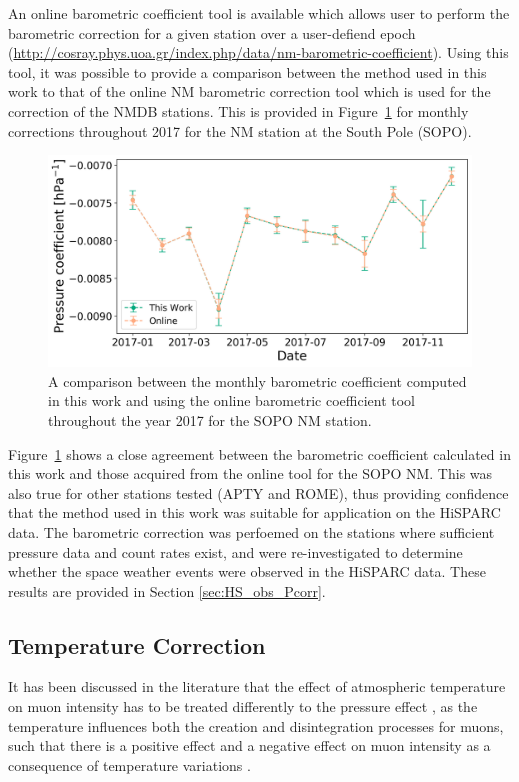 An online barometric coefficient tool is available which allows user to perform the barometric correction for a given station over a user-defiend epoch (\url{http://cosray.phys.uoa.gr/index.php/data/nm-barometric-coefficient}). Using this tool, it was possible to provide a comparison between the method used in this work to that of the online NM barometric correction tool which is used for the correction of the NMDB stations. This is provided in Figure~\ref{fig:NM_beta_variation} for monthly corrections throughout 2017 for the NM station at the South Pole (SOPO).

\begin{figure}[ht]
	\centering
	\includegraphics[width=0.65\columnwidth]{SOPO_beta_2017.png}
	\caption{A comparison between the monthly barometric coefficient computed in this work and using the online barometric coefficient tool throughout the year 2017 for the SOPO NM station.}
	\label{fig:NM_beta_variation}
\end{figure}


Figure~\ref{fig:NM_beta_variation} shows a close agreement between the barometric coefficient calculated in this work and those acquired from the online tool for the SOPO NM. This was also true for other stations tested (APTY and ROME), thus providing confidence that the method used in this work was suitable for application on the HiSPARC data. The barometric correction was perfoemed on the stations where sufficient pressure data and count rates exist, and were re-investigated to determine whether the space weather events were observed in the HiSPARC data. These results are provided in Section \ref{sec:HS_obs_Pcorr}.



\subsection{Temperature Correction}\label{sec:HS_T_corr}

It has been discussed in the literature that the effect of atmospheric temperature on muon intensity has to be treated differently to the pressure effect \citep{berkova_temperature_2011}, as the temperature influences both the creation and disintegration processes for muons, such that there is a positive effect and a negative effect on muon intensity as a consequence of temperature variations \citep{mendoncca_temperature_2016}. 

